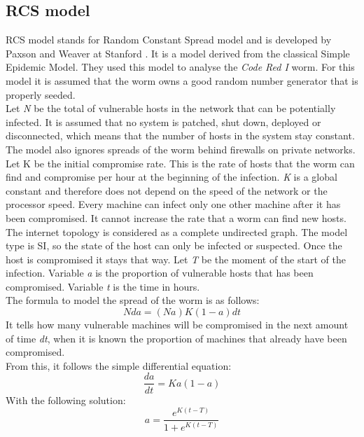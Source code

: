 \subsection{RCS model}

RCS model stands for Random Constant Spread model and is developed by Paxson and Weaver at Stanford \citep{OwnInternetSI}. It is a model derived from the classical Simple Epidemic Model. They used this model to analyse the \textit{Code Red I} worm. For this model it is assumed that the worm owns a good random number generator that is properly seeded. \\
Let\textit{ N} be the total of vulnerable hosts in the network that can be potentially infected. It is assumed that no system is patched, shut down, deployed or disconnected, which means that the number of hosts in the system stay constant. The model also ignores spreads of the worm behind firewalls on private networks. \\
Let K be the initial compromise rate. This is the rate of hosts that the worm can find and compromise per hour at the beginning of the infection. \textit{K} is a global constant and therefore does not depend on the speed of the network or the processor speed.  Every machine can infect only one other machine after it has been compromised. It cannot increase the rate that a worm can find new hosts. 
The internet topology is considered as a complete undirected graph.  The model type is SI, so the state of the host can only be infected or suspected. Once the host is compromised it stays that way.  
Let \textit{T} be the moment of the start of the infection. Variable \textit{a} is the proportion of vulnerable hosts that has been compromised. Variable \textit{t} is the time in hours. \\

The formula to model the spread of the worm is as follows:
\begin{equation}
N da = (N a)K(1 - a)dt
\end{equation}
It tells how many vulnerable machines will be compromised in the next amount of time \textit{dt}, when it is known the proportion of machines  that already have been compromised.\\

From this, it follows the simple differential equation:
\begin{equation}
\dfrac{d a}{dt} = Ka(1-a)
\end{equation}
With the following solution:
\begin{equation}
a = \dfrac{e^{K(t-T)}}{1+e^{K(t-T)}}
\end{equation}
\\

